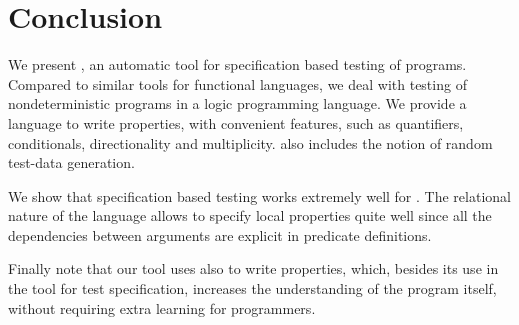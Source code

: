 
\section{Conclusion}
\label{sec:conclusion}



We present \plqc{}, an automatic tool for specification based
testing of \Prolog{} programs.
%
Compared to similar tools for functional languages, we deal with testing
of nondeterministic programs in a logic programming language.
%
We provide a language to write properties, with convenient features,
such as quantifiers, conditionals, directionality and multiplicity.
%
\plqc{} also includes the notion of random test-data generation.
%


We show that specification based testing works extremely well for
\Prolog.
%
The relational nature of the language allows to specify local properties
quite well since all the dependencies between arguments are explicit in
predicate definitions.


Finally note that our tool uses \Prolog{} also to write properties, which,
besides its use in the tool for test specification, increases the
understanding of the program itself, without requiring extra learning for
\Prolog{} programmers.
